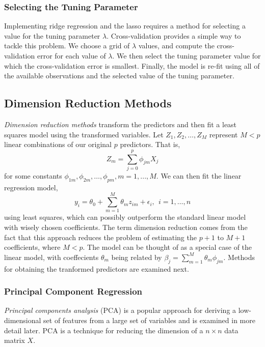 \documentclass{article}
\numberwithin{equation}{section}
\begin{document}
\begin{enumerate}
\subsubsection{Selecting the Tuning Parameter}
Implementing ridge regression and the lasso requires a method for selecting a value for the tuning parameter $\lambda$.  Cross-validation provides a simple way to tackle this problem. We choose a grid of $\lambda$ values, and compute the cross-validation error for each value of $\lambda$. We then select the tuning parameter value for which the cross-validation error is smallest. Finally, the model is re-fit using all of the available observations and the selected value of the tuning parameter.


\subsection{Dimension Reduction Methods}
\textit{Dimension reduction methods} transform the predictors and then fit a least squares model using the transformed variables. Let $Z_1, Z_2,\dots, Z_M$ represent $M<p$ linear combinations of our original $p$ predictors. That is,
\begin{equation}
    Z_m = \sum_{j=0}^p \phi_{jm}X_j
\end{equation}
for some constants $\phi_{1m}, \phi_{2m},\dots,\phi_{pm}, m = 1,...,M$. We can then fit the linear regression model,
\begin{equation}
    y_i = \theta_0 + \sum_{m=1}^M \theta_m z_{im} + \epsilon_i, \ \ i = 1,\dots, n
\end{equation}
using least squares, which can possibly outperform the standard linear model with wisely chosen coefficients. The term dimension reduction comes from the fact that this approach reduces the problem of estimating the $p+1$ to $M+1$ coefficients, where $M < p$. The model can be thought of as a special case of the linear model, with coeffecients $\theta_m$ being related by $\beta_j = \sum_{m=1}^M \theta_m \phi_{jm}$. Methods for obtaining the tranformed predictors are examined next.

\subsubsection{Principal Component Regression}
\textit{Principal components analysis} (PCA) is a popular approach for deriving a low-dimensional set of features from a large set of variables and is examined in more detail later. PCA is a technique for reducing the dimension of a $n \times n$ data matrix $X$.


\end{enumerate}
\end{document}
